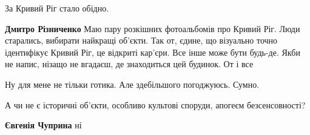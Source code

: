 \begin{itemize}
 
За Кривий Ріг стало обідно.

\begin{itemize} %
 
\textbf{Дмитро Різниченко} Маю пару розкішних фотоальбомів про Кривий Ріг. Люди старались, вибирати найкращі об'єкти. Так от, єдине, що візуально точно ідентифікує Кривий Ріг, це відкриті кар'єри. Все інше може бути будь-де. Якби не напис, нізащо не вгадаєш, де знаходиться цей будинок. От і все
\end{itemize} %

 
Ну для мене не тільки готика. Але здебільшого погоджуюсь. Сумно.

 
А чи не є історичні об'єкти, особливо культові споруди, апогеєм безсенсовності?

\begin{itemize} %
 
\textbf{Євгенія Чуприна} ні


 

\end{itemize}
\end{itemize}
